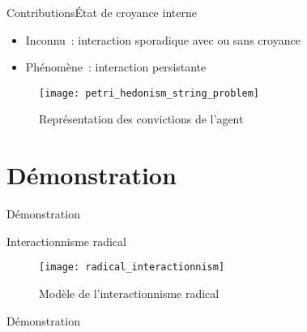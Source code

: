\documentclass{beamer}
\begin{document}

\begin{frame}{Contributions}{État de croyance interne}
\begin{itemize}
\item Inconnu~: interaction sporadique avec ou sans croyance
\item Phénomène~: interaction persistante
\end{itemize}
\begin{figure}
\centering
\texttt{[image: petri\_hedonism\_string\_problem]}
\caption{Représentation des convictions de l'agent}
\label{fig:internalObjects}
\end{figure}
\end{frame}
\section{Démonstration}
\begin{frame}{Démonstration}

\end{frame}

\begin{frame}{Interactionnisme radical}
\begin{figure}
	\centering
	\texttt{[image: radical\_interactionnism]}
	\caption{Modèle de l'interactionnisme radical}
\end{figure}
\end{frame}

\begin{frame}{Démonstration}
\end{frame}
%	
\end{document}
